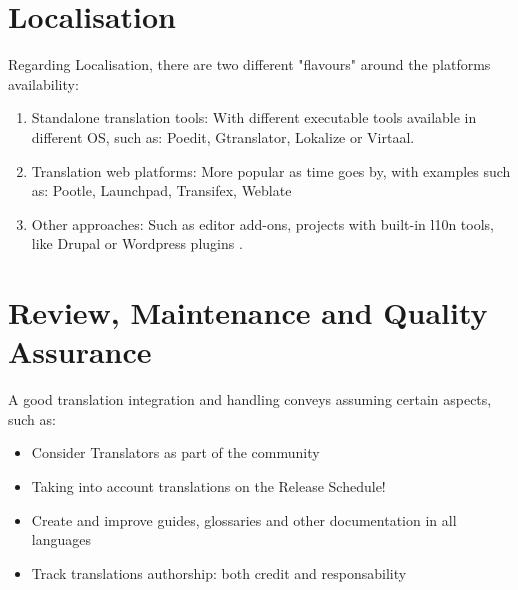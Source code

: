 \documentclass[11pt]{article}
\begin{document}
\section{Localisation}
Regarding Localisation, there are two different "flavours" around the platforms availability:
\begin{enumerate}
\item{Standalone translation tools}: With different executable tools available in different OS, such as:
Poedit, Gtranslator, Lokalize or Virtaal.
\item{Translation web platforms}: More popular as time goes by, with examples such as:
Pootle, Launchpad, Transifex, Weblate
\item{Other approaches}: Such as editor add-ons, projects with built-in l10n tools, like Drupal or Wordpress plugins
.
\end{enumerate}
\section{Review, Maintenance and Quality Assurance}
A good translation integration and handling conveys assuming certain aspects, such as:
\begin{itemize}
\item{Consider Translators as part of the community}
\item{Taking into account translations on the Release Schedule!}
\item{Create and improve guides, glossaries and other documentation in all languages}
\item{Track translations authorship: both credit and responsability}
\end{itemize}
\end{document}
